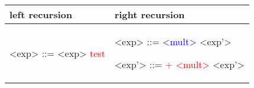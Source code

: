 \begin{center}
	\begin{tabular}{p{5cm} | p{5cm}}
		left recursion
		&
		right recursion
		\\
		\hline

		
		\begin{grammarEx}
			<exp> ::= <exp> \textcolor{red}{test}
			\alt \textcolor{blue}{\textbeta}
		\end{grammarEx}
		
		&
		
		\begin{grammarEx}
			<exp> ::= \textcolor{blue}{\textless mult\textgreater} <exp'>
			
			<exp'> ::= \textcolor{red}{+ \textless mult\textgreater} <exp'>
			\alt \textepsilon
		\end{grammarEx}
		
	\end{tabular}
\end{center}